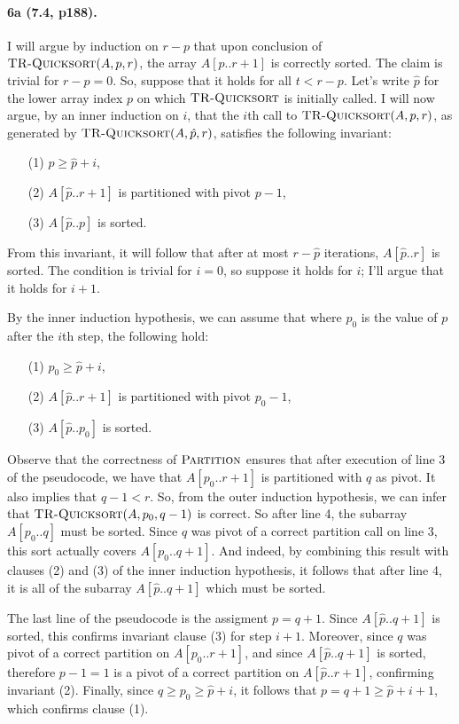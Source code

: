 \documentclass[
]{article}
\begin{document}
\paragraph{6a (7.4, p188).}  I will argue by induction on $r-p$ that upon conclusion of $\textsc{TR-Quicksort}(A, p, r)$, the array $A[p..r+1]$ is correctly sorted.  The claim is trivial for $r-p = 0$.  So, suppose that it holds for all $t < r-p$.  Let's write $\hat p$ for the lower array index $p$ on which $\textsc{TR-Quicksort}$ is initially called. 
I will now argue, by an inner induction on $i$, that the $i$th call to $\textsc{TR-Quicksort}(A, p, r)$, as generated by $\textsc{TR-Quicksort}(A, \hat p, r)$, satisfies the following invariant: 
\begin{itemize}
\item[(1)] $p\geq\hat p+i$, 
\item[(2)] $A[\hat p..r+1]$ is partitioned with pivot $p-1$,
\item[(3)] $A[\hat p..p]$ is sorted.
\end{itemize}
From this invariant, it will follow that after at most $r - \hat p$ iterations, $A[\hat p..r]$ is sorted.  The condition is trivial for $i=0$, so suppose it holds for $i$; I'll argue that it holds for $i+1$.

By the inner induction hypothesis, we can assume that where $p_0$ is the value of $p$ after the $i$th step, the following hold: 
\begin{itemize}
\item[(1)] $p_0\geq\hat p+i$, 
\item[(2)] $A[\hat p..r+1]$ is partitioned with pivot $p_0-1$,
\item[(3)] $A[\hat p..p_0]$ is sorted.
\end{itemize}

Observe that the correctness of $\textsc{Partition}$ ensures that after execution of line 3 of the pseudocode, we have that $A[p_0..r+1]$ is partitioned with $q$ as pivot. It also implies that $q - 1 < r$.  So, from the outer induction hypothesis, we can infer that $\textsc{TR-Quicksort}(A, p_0, q-1)$ is correct. So after line 4, the subarray $A[p_0..q]$ must be sorted.  Since $q$ was pivot of a correct partition call on line 3, this sort actually covers $A[p_0..q+1]$.  And indeed, by combining this result with clauses (2) and (3) of the inner induction hypothesis, it follows that after line 4, it is all of the subarray $A[\hat p..q+1]$ which must be sorted.

The last line of the pseudocode is the assigment $p=q+1$.  Since $A[\hat p..q+1]$ is sorted, this confirms invariant clause (3) for step $i+1$.  Moreover, since $q$ was pivot of a correct partition on $A[p_0..r+1]$, and since $A[\hat p..q+1]$ is sorted, therefore $p-1 = 1$  is a pivot of a correct partition on $A[\hat p..r+1]$, confirming invariant (2).  Finally, since $q\geq p_0\geq\hat p+i$, it follows that $p=q+1\geq\hat p + i + 1$, which confirms clause (1).  
\end{document}
